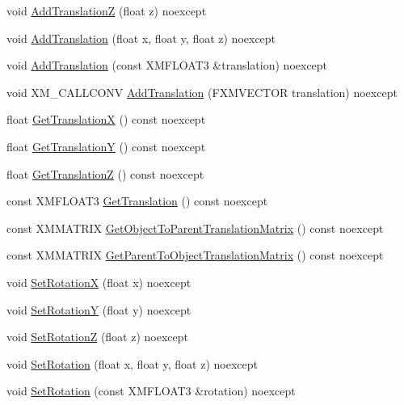 \begin{DoxyCompactItemize}
void \hyperlink{structmage_1_1_transform_node_a61f1e890ed57bde29bbd7aa93b15c1b7}{Add\+TranslationZ} (float z) noexcept
\item 
void \hyperlink{structmage_1_1_transform_node_a467c84142e3733e5358182ab1c7b88e2}{Add\+Translation} (float x, float y, float z) noexcept
\item 
void \hyperlink{structmage_1_1_transform_node_a8310335915abb6583bbae4aa2a0e3b20}{Add\+Translation} (const X\+M\+F\+L\+O\+A\+T3 \&translation) noexcept
\item 
void X\+M\+\_\+\+C\+A\+L\+L\+C\+O\+NV \hyperlink{structmage_1_1_transform_node_aa1241519dfcb8179d4564847e20c1c2c}{Add\+Translation} (F\+X\+M\+V\+E\+C\+T\+OR translation) noexcept
\item 
float \hyperlink{structmage_1_1_transform_node_a5902ec9d6b67c1b7113a1f986fe869a2}{Get\+TranslationX} () const noexcept
\item 
float \hyperlink{structmage_1_1_transform_node_a8286ea3470a015fc04df4a9b9d1ae1bd}{Get\+TranslationY} () const noexcept
\item 
float \hyperlink{structmage_1_1_transform_node_a0a8ec0d7dcdb80443b973f314b98aa0a}{Get\+TranslationZ} () const noexcept
\item 
const X\+M\+F\+L\+O\+A\+T3 \hyperlink{structmage_1_1_transform_node_a98da5fb59f03d37a615a9846e5f5e926}{Get\+Translation} () const noexcept
\item 
const X\+M\+M\+A\+T\+R\+IX \hyperlink{structmage_1_1_transform_node_a32c025e3ded200decae648f7e249dfe2}{Get\+Object\+To\+Parent\+Translation\+Matrix} () const noexcept
\item 
const X\+M\+M\+A\+T\+R\+IX \hyperlink{structmage_1_1_transform_node_a11feea92825b1b537940cd8105edd801}{Get\+Parent\+To\+Object\+Translation\+Matrix} () const noexcept
\item 
void \hyperlink{structmage_1_1_transform_node_af7a75791823e427d3581b60a5a9ede95}{Set\+RotationX} (float x) noexcept
\item 
void \hyperlink{structmage_1_1_transform_node_a688e336889e2cd9beee20c2170f4db12}{Set\+RotationY} (float y) noexcept
\item 
void \hyperlink{structmage_1_1_transform_node_a0c668541d850db84f9ced7cf1bc526a5}{Set\+RotationZ} (float z) noexcept
\item 
void \hyperlink{structmage_1_1_transform_node_a1fee4f95234f13b7f8fae231ac58f423}{Set\+Rotation} (float x, float y, float z) noexcept
\item 
void \hyperlink{structmage_1_1_transform_node_a602e7426e81f712a2c5dfcb29e69457b}{Set\+Rotation} (const X\+M\+F\+L\+O\+A\+T3 \&rotation) noexcept

\end{DoxyCompactItemize}
